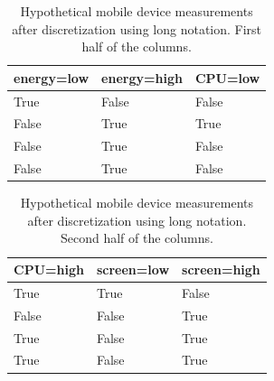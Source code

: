 
\begin{table}[htb]
    \begin{tabular}{ | l | l | l | }
    \hline
    \textbf{energy=low} & \textbf{energy=high} & \textbf{CPU=low} \\ \hline
    True & False & False  \\ \hline 
    False & True & True  \\ \hline 
    False & True & False  \\ \hline 
    False & True & False  \\ \hline
    \end{tabular}
	\caption{Hypothetical mobile device measurements after discretization using long notation. First half of the columns.}
	\label{table:discreteData-1}
\end{table}

\begin{table}[htb]
    \begin{tabular}{ | l | l | l | }
    \hline
    \textbf{CPU=high} & \textbf{screen=low} & \textbf{screen=high} \\ \hline
	True & True & False \\ \hline
	False & False & True \\ \hline    
    True & False & True \\ \hline
    True & False & True \\ \hline
    \end{tabular}
	\caption{Hypothetical mobile device measurements after discretization using long notation. Second half of the columns.}
	\label{table:discreteData-2}
\end{table}



